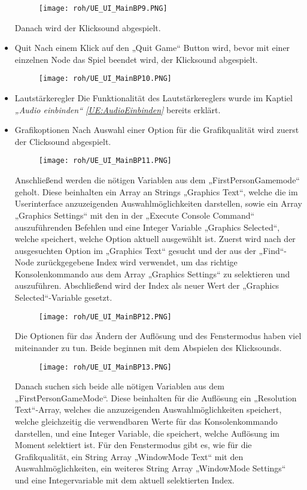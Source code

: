 \begin{itemize}
\begin{figure}[H]
        \texttt{[image: roh/UE\_UI\_MainBP9.PNG]}
        \label{UE:UI_MainBP9}
    \end{figure}
    Danach wird der Klicksound abgespielt.
    \item Quit
    Nach einem Klick auf den „Quit Game“ Button wird, bevor mit einer einzelnen Node das Spiel beendet wird, der Klicksound abgespielt.
    \begin{figure}[H]
        \centering
        \texttt{[image: roh/UE\_UI\_MainBP10.PNG]}
        \label{UE:UI_MainBP10}
    \end{figure}
    \item Lautstärkeregler
    Die Funktionalität des Lautstärkereglers wurde im Kaptiel \textit{„Audio einbinden“ \ref{UE:AudioEinbinden}} bereits erklärt.
    \item Grafikoptionen
    Nach Auswahl einer Option für die Grafikqualität wird zuerst der Clicksound abgespielt.
    \begin{figure}[H]
        \centering
        \texttt{[image: roh/UE\_UI\_MainBP11.PNG]}
        \label{UE:UI_MainBP11}
    \end{figure}
    Anschließend werden die nötigen Variablen aus dem „FirstPersonGamemode“ geholt. Diese beinhalten ein Array an Strings „Graphics Text“, welche die im Userinterface anzuzeigenden Auswahlmöglichkeiten darstellen, sowie ein Array „Graphics Settings“ mit den in der „Execute Console Command“ auszuführenden Befehlen und eine Integer Variable „Graphics Selected“, welche speichert, welche Option aktuell ausgewählt ist.
    Zuerst wird nach der ausgesuchten Option im „Graphics Text“ gesucht und der aus der „Find“-Node zurückgegebene Index wird verwendet, um das richtige Konsolenkommando aus dem Array „Graphics Settings“ zu selektieren und auszuführen. Abschließend wird der Index als neuer Wert der „Graphics Selected“-Variable gesetzt.
    \begin{figure}[H]
        \centering
        \texttt{[image: roh/UE\_UI\_MainBP12.PNG]}
        \label{UE:UI_MainBP12}
    \end{figure}
    Die Optionen für das Ändern der Auflösung und des Fenstermodus haben viel miteinander zu tun. Beide beginnen mit dem Abspielen des Klicksounds.
    \begin{figure}[H]
        \centering
        \texttt{[image: roh/UE\_UI\_MainBP13.PNG]}
        \label{UE:UI_MainBP13}
    \end{figure}
    Danach suchen sich beide alle nötigen Variablen aus dem „FirstPersonGameMode“. Diese beinhalten für die Auflösung ein „Resolution Text“-Array, welches die anzuzeigenden Auswahlmöglichkeiten speichert, welche gleichzeitig die verwendbaren Werte für das Konsolenkommando darstellen, und eine Integer Variable, die speichert, welche Auflösung im Moment selektiert ist. Für den Fenstermodus gibt es, wie für die Grafikqualität, ein String Array „WindowMode Text“ mit den Auswahlmöglichkeiten, ein weiteres String Array „WindowMode Settings“ und eine Integervariable mit dem aktuell selektierten Index.

\end{itemize}
